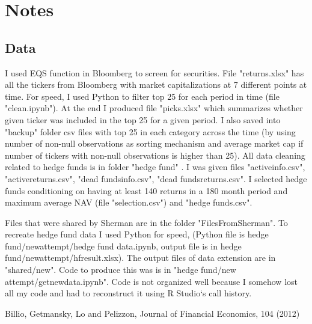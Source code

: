 \documentclass[preprint,pre,floats,aps,amsmath,amssymb]{revtex4}
\begin{document}
\section{Notes}
\subsection{Data}
I used EQS function in Bloomberg to screen for securities. File "returns.xlsx" has all the tickers from Bloomberg with market capitalizations at 7 different points at time. For speed, I used Python to filter top 25 for each period in time (file "clean.ipynb"). At the end I produced file "picks.xlsx" which summarizes whether given ticker was included in the top 25 for a given period. I also saved into "backup" folder csv files with top 25 in each category across the time (by using number of non-null observations as sorting mechanism and average market cap if number of tickers with non-null observations is higher than 25). 
\indent
All data cleaning related to hedge funds is in folder "hedge fund" . I was given files "active\textunderscore info.csv", "active\textunderscore returns.csv", "dead funds\textunderscore info.csv", "dead funds\textunderscore returns.csv". I selected hedge funds conditioning on having at least 140 returns in a 180 month period and maximum average NAV (file "selection.csv") and "hedge funds.csv".

\indent
Files that were shared by Sherman are in the folder "FilesFromSherman". To recreate hedge fund data I used Python for speed, (Python file is hedge fund/newattempt/hedge fund data.ipynb, output file is in hedge fund/newattempt/hf\textunderscore result.xlsx). The output files of data extension are in "shared/new". Code to produce this was is in "hedge fund/new attempt/get\textunderscore new\textunderscore data.ipynb". Code is not organized well because I somehow lost all my code and had to reconstruct it using R Studio`s call history. 





\begin{thebibliography}{99}

 Billio, Getmansky, Lo and Pelizzon, Journal of Financial Economics, 104 (2012)

\end{thebibliography}
\end{document}
